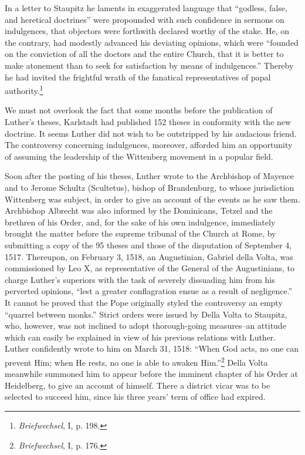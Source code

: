 In a letter to Staupitz he laments in exaggerated language that
“godless, false, and heretical doctrines” were propounded with such
confidence in sermons on indulgences, that objectors were forthwith
declared worthy of the stake. He, on the contrary, had modestly
advanced his deviating opinions, which were “founded on the conviction
of all the doctors and the entire Church, that it is better to
make atonement than to seek for satisfaction by means of indulgences.”
Thereby he had invited the frightful wrath of the fanatical
representatives of papal authority.\footnote{\textit{Briefwechsel}, I, p. 198.}

We must not overlook the fact that some months before the publication of
Luther’s theses, Karlstadt had published 152 theses in conformity
with the new doctrine. It seems Luther did not wish to be
outstripped by his audacious friend. The controversy concerning indulgences,
moreover, afforded him an opportunity of assuming the
leadership of the Wittenberg movement in a popular field.

Soon after the posting of his theses, Luther wrote to the Archbishop
of Mayence and to Jerome Schultz (Scultetus), bishop of Brandenburg,
to whose jurisdiction Wittenberg was subject, in order to give an
account of the events as he saw them. Archbishop Albrecht was also
informed by the Dominicans, Tetzel and the brethren of his Order,
and, for the sake of his own indulgence, immediately brought the
matter before the supreme tribunal of the Church at Rome, by submitting
a copy of the 95 theses and those of the disputation of September
4, 1517. Thereupon, on February 3, 1518, an Augustinian,
Gabriel della Volta, was commissioned by Leo X, as representative
of the General of the Augustinians, to charge Luther’s
superiors with the task of severely dissuading him from his perverted
opinions, “lest a greater conflagration ensue as a result of negligence.”
It cannot be proved that the Pope originally styled the controversy an
empty “quarrel between monks.” Strict orders were issued
by Della Volta to Staupitz, who, however, was not inclined to
adopt thorough-going measures--an attitude which can easily be explained
in view of his previous relations with Luther. Luther confidently
wrote to him on March 31, 1518: “When God acts, no one can prevent Him;
when He rests, no one is able to awaken Him.”\footnote
{\textit{Briefwechsel}, I, p. 176.}
Della Volta meanwhile summoned him to appear before the imminent
chapter of his Order at Heidelberg, to give an account of himself.
There a district vicar was to be selected to succeed him, since his
three years’ term of office had expired.

